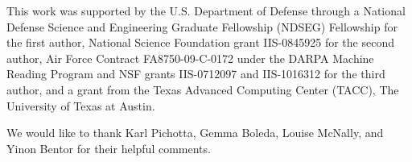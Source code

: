 This work was supported by the U.S. Department of Defense through a National
Defense Science and Engineering Graduate Fellowship (NDSEG) Fellowship for the
first author, National Science Foundation grant IIS-0845925 for the second
author, Air Force Contract FA8750-09-C-0172 under the DARPA Machine Reading
Program and NSF grants IIS-0712097 and IIS-1016312 for the third author, and a
grant from the Texas Advanced Computing Center (TACC), The University of Texas
at Austin.

We would like to thank Karl Pichotta, Gemma Boleda, Louise McNally, and Yinon 
Bentor for their helpful comments.
